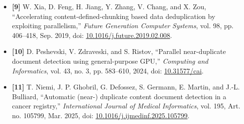 \documentclass[11pt,a4paper]{article}
\renewcommand{\_}{\textunderscore\allowbreak}
\begin{document}
\begin{itemize}[label={}, leftmargin=0pt, itemsep=0.45em]
    \item \textbf{[9]} W. Xia, D. Feng, H. Jiang, Y. Zhang, V. Chang, and X. Zou, ``Accelerating content-defined-chunking based data deduplication by exploiting parallelism,'' \textit{Future Generation Computer Systems}, vol. 98, pp. 406--418, Sep. 2019, doi: \href{https://doi.org/10.1016/j.future.2019.02.008}{10.1016/j.future.2019.02.008}.
    \item \textbf{[10]} D. Peshevski, V. Zdraveski, and S. Ristov, ``Parallel near-duplicate document detection using general-purpose GPU,'' \textit{Computing and Informatics}, vol. 43, no. 3, pp. 583--610, 2024, doi: \href{https://doi.org/10.31577/cai_2024_3_583}{10.31577/cai\_2024\_3\_583}.
    \item \textbf{[11]} T. Niemi, J. P. Ghobril, G. Defossez, S. Germann, E. Martin, and J.-L. Bulliard, ``Automatic (near-) duplicate content document detection in a cancer registry,'' \textit{International Journal of Medical Informatics}, vol. 195, Art. no. 105799, Mar. 2025, doi: \href{https://doi.org/10.1016/j.ijmedinf.2025.105799}{10.1016/j.ijmedinf.2025.105799}.
\end{itemize}
\end{document}
